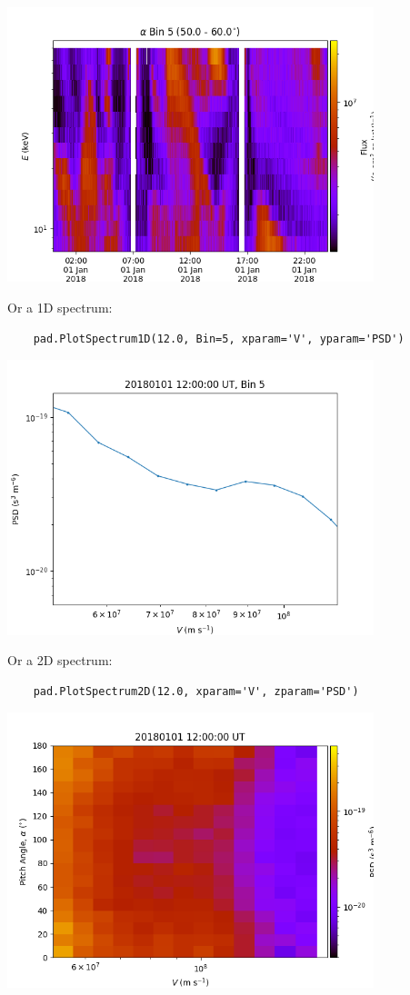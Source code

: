 	\includegraphics[width=0.8\textwidth]{figures/ch4_ArasePADSpectrogram.png}
	
	Or a 1D spectrum:
	\begin{verbatim}
	pad.PlotSpectrum1D(12.0, Bin=5, xparam='V', yparam='PSD')
	\end{verbatim}
	
	\includegraphics[width=0.8\textwidth]{figures/ch4_ArasePAD1DSpectrum.png}
	
	Or a 2D spectrum:
	\begin{verbatim}
	pad.PlotSpectrum2D(12.0, xparam='V', zparam='PSD')
	\end{verbatim}
	
	\includegraphics[width=0.8\textwidth]{figures/ch4_ArasePAD2DSpectrum.png}
	
